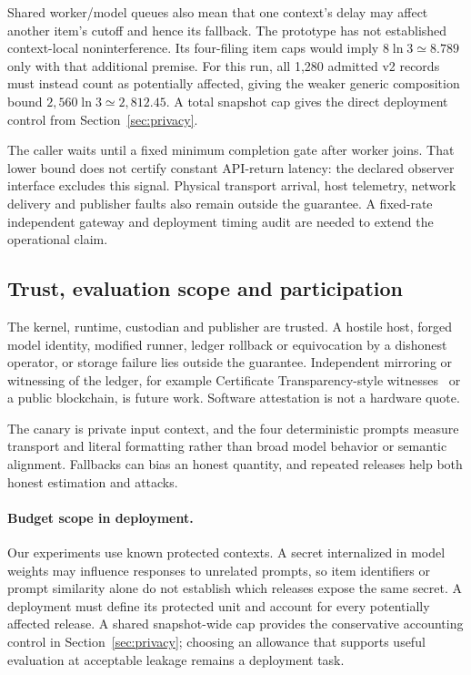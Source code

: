 \documentclass[10pt,twocolumn]{article}
\begin{document}
Shared worker/model queues also mean that one context's delay may affect another item's cutoff and hence its fallback. The prototype has not established context-local noninterference. Its four-filing item caps would imply $8\ln3\simeq8.789$ only with that additional premise. For this run, all 1{,}280 admitted v2 records must instead count as potentially affected, giving the weaker generic composition bound $2{,}560\ln3\simeq2{,}812.45$. A total snapshot cap gives the direct deployment control from Section~\ref{sec:privacy}.

The caller waits until a fixed minimum completion gate after worker joins. That lower bound does not certify constant API-return latency: the declared observer interface excludes this signal. Physical transport arrival, host telemetry, network delivery and publisher faults also remain outside the guarantee. A fixed-rate independent gateway and deployment timing audit are needed to extend the operational claim.

\subsection{Trust, evaluation scope and participation}


The kernel, runtime, custodian and publisher are trusted. A hostile host, forged model identity, modified runner, ledger rollback or equivocation by a dishonest operator, or storage failure lies outside the guarantee. Independent mirroring or witnessing of the ledger, for example Certificate Transparency-style witnesses~\cite{ct} or a public blockchain, is future work. Software attestation is not a hardware quote.

The canary is private input context, and the four deterministic prompts measure transport and literal formatting rather than broad model behavior or semantic alignment. Fallbacks can bias an honest quantity, and repeated releases help both honest estimation and attacks.

\paragraph{Budget scope in deployment.} Our experiments use known protected contexts. A secret internalized in model weights may influence responses to unrelated prompts, so item identifiers or prompt similarity alone do not establish which releases expose the same secret. A deployment must define its protected unit and account for every potentially affected release. A shared snapshot-wide cap provides the conservative accounting control in Section~\ref{sec:privacy}; choosing an allowance that supports useful evaluation at acceptable leakage remains a deployment task.
\end{document}
